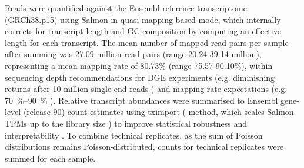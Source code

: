 Reads were quantified against the Ensembl reference transcriptome (GRCh38.p15) using Salmon \autocite{patro2017SalmonProvidesFast} in quasi-mapping-based mode, 
which internally corrects for transcript length and GC composition by computing an effective length for each transcript.
%
%
The mean number of mapped read pairs per sample after summing was 27.09 million read pairs (range 20.24-39.14 million), representing a mean mapping rate of 80.73\% (range 75.57-90.10\%), within sequencing depth recommendations for \gls{DGE} experiments (e.g. diminishing returns after 10 million single-end reads \autocite{liu2014RNAseqDifferentialExpression}) and mapping rate expectations (e.g. \SIrange{70}{90}{\percent} \autocite{conesa2016SurveyBestPractices}).
%
Relative transcript abundances were summarised to Ensembl gene-level (release 90) count estimates using tximport ( method, which scales Salmon \glspl{TPM} up to the library size \autocite{soneson2016DifferentialAnalysesRNAseq,love2018SwimmingDownstreamStatistical}) to improve statistical robustness and interpretability \autocite{soneson2016DifferentialAnalysesRNAseq}.
To combine technical replicates, as the sum of Poisson distributions remains Poisson-distributed, counts for technical replicates were summed for each sample.

